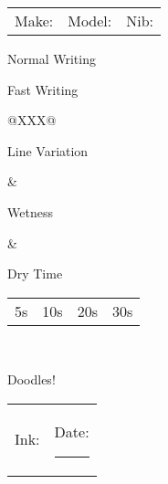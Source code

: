 \documentclass[letterpaper,12pt]{memoir}
\begin{document}
\begin{tabularx}{\textwidth}{@{}XXX@{}}
Make: \textcolor{lightgray}{\hrulefill} & Model: \textcolor{lightgray}{\hrulefill} & Nib: \textcolor{lightgray}{\hrulefill}
\end{tabularx}

\begin{prettyframed}{Normal Writing}
  \vspace{0.75in}
\end{prettyframed}

\begin{prettyframed}{Fast Writing}
  \vspace{0.75in}
\end{prettyframed}

\vspace{-1em}
\begin{tabularx}{\textwidth}{@{}XXX@{}}
  \begin{prettyframed}{Line Variation}
    \begin{minipage}[t][1.5in][t]{\textwidth}
      \begin{vplace}[0.2]
        \hspace*{\fill}\hspace*{\fill}
      \end{vplace}
    \end{minipage}
  \end{prettyframed} &
                       \begin{prettyframed}{Wetness}
                         \begin{minipage}[t][1.5in][t]{\textwidth}

                         \end{minipage}
                       \end{prettyframed} &
                                            \begin{prettyframed}{Dry Time}
                                              \begin{minipage}[t][1.5in][t]{\textwidth}
                                                {\begin{tabularx}{\textwidth}{cXXX}
                                                   5s & 10s & 20s & 30s
                                                 \end{tabularx}}
                                              \end{minipage}
                                            \end{prettyframed} \\
\end{tabularx}
\vspace{-3em}

\begin{prettyframed}{Doodles!}
  \vspace{2in}
\end{prettyframed}

\vfill

\begin{tabularx}{\textwidth}{@{}X r@{}}
Ink: \textcolor{lightgray}{\hrulefill} & Date: \textcolor{lightgray}{\rule{5cm}{0.4pt}}
\end{tabularx}
\end{document}
